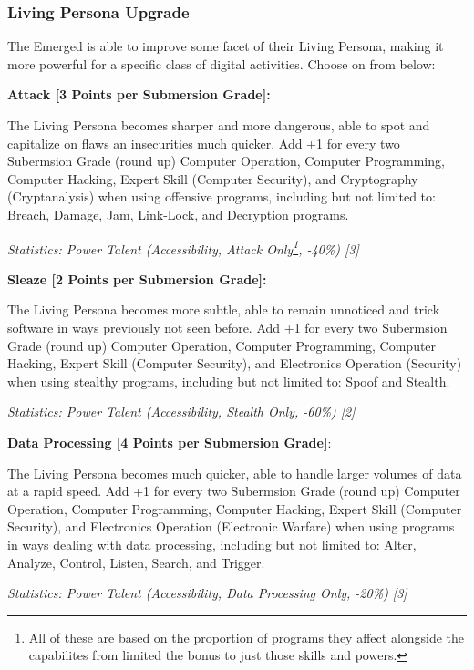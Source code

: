 \begin{multicols*}{3}
	\subsubsection{Living Persona Upgrade}
	
	The Emerged is able to improve some facet of their Living Persona, making it more powerful for a specific class of digital activities. Choose on from below:
	
	\textbf{Attack [3 Points per Submersion Grade]:}
	
	The Living Persona becomes sharper and more dangerous, able to spot and capitalize on flaws an insecurities much quicker. Add +1 for every two Subermsion Grade (round up) Computer Operation, Computer Programming, Computer Hacking, Expert Skill (Computer Security), and Cryptography (Cryptanalysis) when using offensive programs, including but not limited to: Breach, Damage, Jam, Link-Lock, and Decryption programs.
	
	\textcolor{OliveGreen}{\textit{Statistics: Power Talent (Accessibility, Attack Only\footnote{All of these are based on the proportion of programs they affect alongside the capabilites from limited the bonus to just those skills and powers.}, -40\%) [3] }}
	
	\textbf{Sleaze [2 Points per Submersion Grade]:}
	
	The Living Persona becomes more subtle, able to remain unnoticed and trick software in ways previously not seen before. Add +1 for every two Subermsion Grade (round up) Computer Operation, Computer Programming, Computer Hacking, Expert Skill (Computer Security), and Electronics Operation (Security) when using stealthy programs, including but not limited to: Spoof and Stealth.
	
	\textcolor{OliveGreen}{\textit{Statistics: Power Talent (Accessibility, Stealth Only, -60\%) [2] }}
		
	\textbf{Data Processing [4 Points per Submersion Grade]}:
	
	The Living Persona becomes much quicker, able to handle larger volumes of data at a rapid speed. Add +1 for every two Subermsion Grade (round up) Computer Operation, Computer Programming, Computer Hacking, Expert Skill (Computer Security), and Electronics Operation (Electronic Warfare) when using programs in ways dealing with data processing, including but not limited to: Alter, Analyze, Control, Listen, Search, and Trigger.
	
	\textcolor{OliveGreen}{\textit{Statistics: Power Talent (Accessibility, Data Processing Only, -20\%) [3] }}	
	

\end{multicols*}
